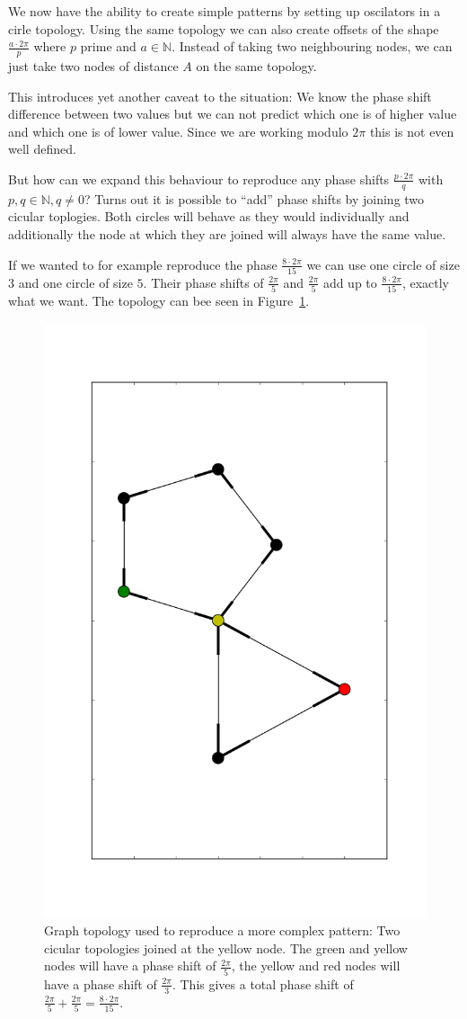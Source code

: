We now have the ability to create simple patterns by setting up oscilators in a cirle topology. Using the same topology we can also create offsets of the shape $\frac{a {\cdot} 2 \pi}{p}$ where $p$ prime and $a \in \mathbb{N}$. Instead of taking two neighbouring nodes, we can just take two nodes of distance $A$ on the same topology. 

This introduces yet another caveat to the situation: We know the phase shift difference between two values but we can not predict which one is of higher value and which one is of lower value. Since we are working modulo $2 \pi$ this is not even well defined. 

But how can we expand this behaviour to reproduce any phase shifts $\frac{p {\cdot} 2 \pi}{q}$ with $p, q \in \mathbb{N}, q \neq 0$? Turns out it is possible to ``add'' phase shifts by joining two cicular toplogies. Both circles will behave as they would individually and additionally the node at which they are joined will always have the same value. 

If we wanted to for example reproduce the phase $\frac{8 {\cdot} 2 \pi}{15}$ we can use one circle of size $3$ and one circle of size $5$. Their phase shifts of $\frac{2\pi}{5}$ and $\frac{2\pi}{5}$ add up to $\frac{8 {\cdot} 2 \pi}{15}$, exactly what we want. The topology can bee seen in Figure~\ref{fig:pattern_joined}. 

\begin{figure}[h]
  \centering
  \includegraphics[height=\textwidth]{imgs/pattern_joined}
  \caption{Graph topology used to reproduce a more complex pattern: Two cicular topologies joined at the yellow node. The green and yellow nodes will have a phase shift of $\frac{2\pi}{5}$, the yellow and red nodes will have a phase shift of $\frac{2\pi}{3}$. This gives a total phase shift of $\frac{2\pi}{5} + \frac{2\pi}{5} = \frac{8 {\cdot} 2 \pi}{15}$. }
  \label{fig:pattern_joined}
\end{figure}

